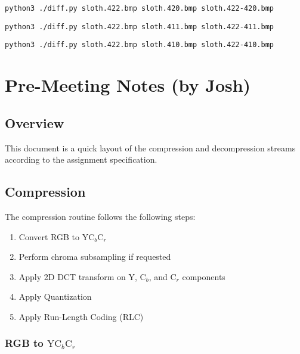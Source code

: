 \documentclass{article}
\begin{document}
\newpage
\begin{lstlisting}
python3 ./diff.py sloth.422.bmp sloth.420.bmp sloth.422-420.bmp
\end{lstlisting}


\newpage
\begin{lstlisting}
python3 ./diff.py sloth.422.bmp sloth.411.bmp sloth.422-411.bmp
\end{lstlisting}


\newpage
\begin{lstlisting}
python3 ./diff.py sloth.422.bmp sloth.410.bmp sloth.422-410.bmp
\end{lstlisting}




\section{Pre-Meeting Notes (by Josh)}

\subsection{Overview}

This document is a quick layout of the compression and decompression
streams according to the assignment specification.

\subsection{Compression}

The compression routine follows the following steps:
\begin{enumerate}
\item Convert RGB to $\text{YC}_{b}\text{C}_{r}$
\item Perform chroma subsampling if requested
\item Apply 2D DCT transform on Y, $\text{C}_{b}$, and $\text{C}_{r}$ components
\item Apply Quantization
\item Apply Run-Length Coding (RLC)
\end{enumerate}

\subsubsection{RGB to $\text{YC}_{b}\text{C}_{r}$}
\end{document}
